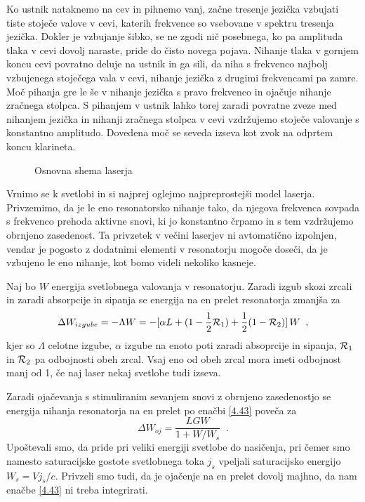 Ko ustnik nataknemo na cev in pihnemo vanj, začne tresenje jezička
vzbujati tiste stoječe valove v cevi, katerih frekvence so vsebovane v
spektru tresenja jezička. Dokler je vzbujanje šibko, se ne zgodi nič
posebnega, ko pa amplituda tlaka v cevi dovolj naraste, pride do čisto
novega pojava. Nihanje tlaka v gornjem koncu cevi povratno deluje na ustnik
in ga sili, da niha s frekvenco najbolj vzbujenega stoječega vala v cevi,
nihanje jezička z drugimi frekvencami pa zamre. Moč pihanja gre le še v
nihanje jezička s pravo frekvenco in ojačuje nihanje zračnega stolpca. S
pihanjem v ustnik lahko torej zaradi povratne zveze med nihanjem jezička in
nihanji zračnega stolpca v cevi vzdržujemo stoječe valovanje s konstantno
amplitudo. Dovedena moč se seveda izseva kot zvok na odprtem koncu
klarineta.

\begin{figure}[tbp]
\label{s5.1} \vskip 5cm
\caption{Osnovna shema laserja}
\end{figure}

Vrnimo se k svetlobi in si najprej oglejmo najpreprostejši model laserja.
Privzemimo, da je le eno resonatorsko nihanje tako, da njegova frekvenca
sovpada s frekvenco prehoda aktivne snovi, ki jo konstantno črpamo in s tem
vzdržujemo obrnjeno zasedenost. Ta privzetek v večini laserjev ni
avtomatično izpolnjen, vendar je pogosto z dodatnimi elementi v resonatorju
mogoče doseči, da je vzbujeno le eno nihanje, kot bomo videli nekoliko
kasneje.

Naj bo $W$ energija svetlobnega valovanja v resonatorju. Zaradi izgub skozi
zrcali in zaradi absorpcije in sipanja se energija na en prelet resonatorja
zmanjša za 
\begin{equation}
\Delta W_{izgube}=-\Lambda W=-[\alpha L+(1-\frac{1}{2}{\cal {R}}_{1})+\frac{1%
}{2}(1-{\cal {R}}_{2})]\,W\;\;,  \label{5.1}
\end{equation}
kjer so $\Lambda $ celotne izgube, $\alpha $ izgube na enoto poti zaradi
absoprcije in sipanja, ${\cal {R}}_{1}$ in ${\cal {R}}_{2}$ pa odbojnosti
obeh zrcal. Vsaj eno od obeh zrcal mora imeti odbojnost manj od 1, če naj
laser nekaj svetlobe tudi izseva.

Zaradi ojačevanja s stimuliranim sevanjem snovi z obrnjeno zasedenostjo se
energija nihanja resonatorja na en prelet po enačbi \ref{4.43} poveča za 
\begin{equation}  \label{5.2}
\Delta W_{oj}=\frac{LGW}{1+W/W_s}\;\;.
\end{equation}
Upoštevali smo, da pride pri veliki energiji svetlobe do nasičenja, pri
čemer smo namesto saturacijske gostote svetlobnega toka $j_s$ vpeljali
saturacijsko energijo $W_s=Vj_s/c$. Privzeli smo tudi, da je ojačenje na en
prelet dovolj majhno, da nam enačbe \ref{4.43} ni treba integrirati.

